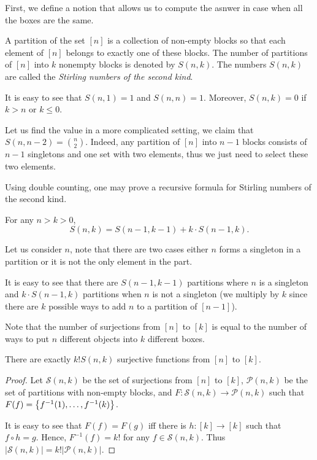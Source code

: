First, we define a notion that allows us to compute the asnwer in case when
all the boxes are the same.
\begin{definition}
  A partition of the set $[n]$ is a collection of non-empty
  blocks so that each element of $[n]$ belongs to exactly
  one of these blocks. The number of partitions of $[n]$
  into $k$ nonempty blocks is denoted by $S(n, k)$.
  The numbers $S(n, k)$ are called the \emph{Stirling numbers
  of the second kind}.
\end{definition}

It is easy to see that $S(n, 1) = 1$ and $S(n, n) = 1$.
Moreover, $S(n, k) = 0$ if $k > n$ or $k \le 0$.

Let us find the value in a more complicated setting, we
claim that $S(n, n - 2) = \binom{n}{2}$. Indeed, any
partition of $[n]$ into $n - 1$ blocks consists of
$n - 1$ singletons and one set with two elements, thus we
just need to select these two elements.

Using double counting, one may prove a recursive formula
for Stirling numbers of the second kind.
\begin{theorem}
  For any $n > k > 0$,
  \[
    S(n, k) = S(n - 1, k - 1) + k \cdot S(n - 1, k).
  \]
\end{theorem}
\begin{theorem}
  Let us consider $n$, note that there are two cases either $n$ forms a
  singleton in a partition or it is not the only element in the part.

  It is easy to see that there are $S(n - 1, k - 1)$ partitions where $n$ is
  a singleton and $k \cdot S(n - 1, k)$ partitions when $n$ is not a singleton
  (we multiply by $k$ since there are $k$ possible ways to add $n$ to a
  partition of $[n - 1]$).
\end{theorem}

Note that the number of surjections from $[n]$ to $[k]$ is equal to the
number of ways to put $n$ different objects into $k$ different boxes.
\begin{lemma}
  There are exactly $k! S(n, k)$ surjective functions from
  $[n]$ to $[k]$.
\end{lemma}
\begin{proof}
  Let $\mathcal{S}(n, k)$ be the set of surjections from $[n]$ to $[k]$,
  $\mathcal{P}(n, k)$ be the set of partitions with non-empty blocks, and
  $F : \mathcal{S}(n, k) \to \mathcal{P}(n, k)$ such that
  $F(f) = \set{f^{-1}(1), \dots, f^{-1}(k)}$.

  It is easy to see that $F(f) = F(g)$ iff there is $h : [k] \to [k]$ such that
  $f \circ h = g$. Hence, $F^{-1}(f) = k!$ for any $f \in \mathcal{S}(n, k)$.
  Thus $|\mathcal{S}(n, k)| = k! |\mathcal{P}(n, k)|$.
\end{proof}

